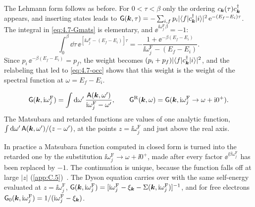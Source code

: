 The Lehmann form follows as before. For $0 < \tau < \beta$ only the ordering $c_{\bm{k}}(\tau)c^\dagger_{\bm{k}}$ appears, and inserting states leads to $\mathsf{G}(\bm{k},\tau) = -\sum_{i,f}p_i|\langle f|c^\dagger_{\bm{k}}|i\rangle|^2\,\mathrm{e}^{-(E_f - E_i)\tau}$. The integral in \cref{eq:4.7-Gmats} is elementary, and $\ee^{\ii\omega^{\mathrm{F}}_j\beta} = -1$:
\begin{equation*}
  \int_0^\beta\dd\tau\,\ee^{[\ii\omega^{\mathrm{F}}_j - (E_f - E_i)]\tau} = -\frac{1 + \ee^{-\beta(E_f - E_i)}}{\ii\omega^{\mathrm{F}}_j - (E_f - E_i)} .
\end{equation*}
Since $p_i\,\ee^{-\beta(E_f - E_i)} = p_f$, the weight becomes $(p_i + p_f)|\langle f|c^\dagger_{\bm{k}}|i\rangle|^2$, and the relabeling that led to \cref{eq:4.7-occ} shows that this weight is the weight of the spectral function at $\omega = E_f - E_i$.
\begin{keyresult}
\begin{equation}
  \mathsf{G}(\bm{k},\mathrm{i}\omega^{\mathrm{F}}_j) = \int\mathrm{d}\omega'\,\frac{\mathsf{A}(\bm{k},\omega')}{\mathrm{i}\omega^{\mathrm{F}}_j - \omega'}, \qquad
  \mathsf{G}^{\mathrm{R}}(\bm{k},\omega) = \mathsf{G}(\bm{k},\mathrm{i}\omega^{\mathrm{F}}_j \to \omega + \mathrm{i}0^+) .
  \label{eq:4.7-continuation}
\end{equation}
The Matsubara and retarded functions are values of one analytic function, $\int\mathrm{d}\omega'\,\mathsf{A}(\bm{k},\omega')/(z - \omega')$, at the points $z = \ii\omega^{\mathrm{F}}_j$ and just above the real axis.
\end{keyresult}
In practice a Matsubara function computed in closed form is turned into the retarded one by the substitution $\ii\omega^{\mathrm{F}}_j \to \omega + \ii0^+$, made after every factor $\ee^{\ii\beta\omega^{\mathrm{F}}_j}$ has been replaced by $-1$. The continuation is unique, because the function falls off at large $|z|$ (\cref{app:C.5})~\cite{baym1961determination}. The Dyson equation carries over with the same self-energy evaluated at $z = \ii\omega^{\mathrm{F}}_j$, $\mathsf{G}(\bm{k},\mathrm{i}\omega^{\mathrm{F}}_j) = [\mathrm{i}\omega^{\mathrm{F}}_j - \xi_{\bm{k}} - \Sigma(\bm{k},\mathrm{i}\omega^{\mathrm{F}}_j)]^{-1}$, and for free electrons $\mathsf{G}_0(\bm{k},\mathrm{i}\omega^{\mathrm{F}}_j) = 1/(\mathrm{i}\omega^{\mathrm{F}}_j - \xi_{\bm{k}})$.

